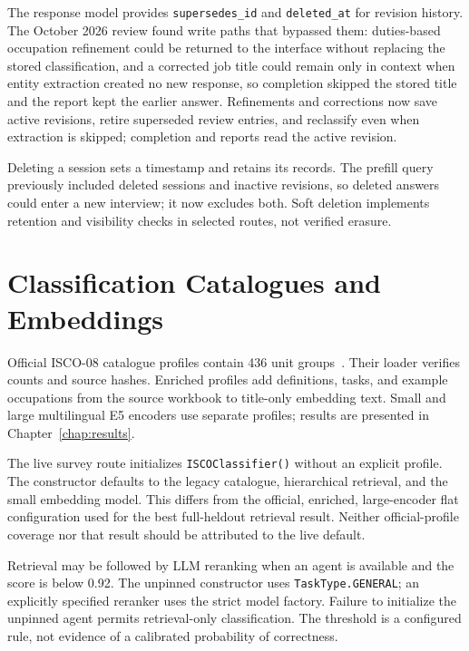 The response model provides \texttt{supersedes\_id} and
\texttt{deleted\_at} for revision history. The October 2026 review found
write paths that bypassed them: duties-based occupation refinement could
be returned to the interface without replacing the stored classification,
and a corrected job title could remain only in context when entity
extraction created no new response, so completion skipped the stored title
and the report kept the earlier answer. Refinements and corrections now
save active revisions, retire superseded review entries, and reclassify
even when extraction is skipped; completion and reports read the active
revision.

Deleting a session sets a timestamp and retains its records. The prefill
query previously included deleted sessions and inactive revisions, so
deleted answers could enter a new interview; it now excludes both. Soft
deletion implements retention and visibility checks in selected routes,
not verified erasure.

\section{Classification Catalogues and Embeddings}
\label{sec:impl-kb}

Official ISCO-08 catalogue profiles contain 436 unit
groups~\cite{ilo2012isco_v1}. Their loader verifies counts
and source hashes. Enriched profiles add definitions, tasks, and example
occupations from the source workbook to title-only embedding text. Small
and large multilingual E5 encoders use separate profiles; results are
presented in Chapter~\ref{chap:results}.

The live survey route initializes \texttt{ISCOClassifier()} without an
explicit profile. The constructor defaults to the legacy catalogue,
hierarchical retrieval, and the small embedding model. This differs from
the official, enriched, large-encoder flat configuration used for the best
full-heldout retrieval result. Neither official-profile coverage nor that result
should be attributed to the live default.

Retrieval may be followed by LLM reranking when an agent is available and
the score is below 0.92. The unpinned constructor uses
\texttt{TaskType.GENERAL}; an explicitly specified reranker uses the strict
model factory. Failure to initialize the unpinned agent permits
retrieval-only classification. The threshold is a configured rule, not
evidence of a calibrated probability of correctness.

